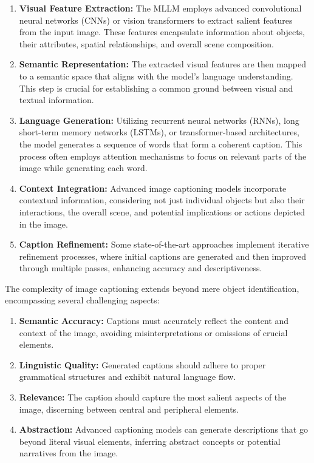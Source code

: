 \begin{enumerate}
    \item \textbf{Visual Feature Extraction:} The MLLM employs advanced convolutional neural networks (CNNs) or vision transformers to extract salient features from the input image. These features encapsulate information about objects, their attributes, spatial relationships, and overall scene composition.
    \item \textbf{Semantic Representation:} The extracted visual features are then mapped to a semantic space that aligns with the model's language understanding. This step is crucial for establishing a common ground between visual and textual information.
    \item \textbf{Language Generation:} Utilizing recurrent neural networks (RNNs), long short-term memory networks (LSTMs), or transformer-based architectures, the model generates a sequence of words that form a coherent caption. This process often employs attention mechanisms to focus on relevant parts of the image while generating each word.
    \item \textbf{Context Integration:} Advanced image captioning models incorporate contextual information, considering not just individual objects but also their interactions, the overall scene, and potential implications or actions depicted in the image.
    \item \textbf{Caption Refinement:} Some state-of-the-art approaches implement iterative refinement processes, where initial captions are generated and then improved through multiple passes, enhancing accuracy and descriptiveness.
\end{enumerate}


The complexity of image captioning extends beyond mere object identification, encompassing several challenging aspects:

\begin{enumerate}
    \item \textbf{Semantic Accuracy:} Captions must accurately reflect the content and context of the image, avoiding misinterpretations or omissions of crucial elements.
    \item \textbf{Linguistic Quality:} Generated captions should adhere to proper grammatical structures and exhibit natural language flow.
    \item \textbf{Relevance:} The caption should capture the most salient aspects of the image, discerning between central and peripheral elements.
    \item \textbf{Abstraction:} Advanced captioning models can generate descriptions that go beyond literal visual elements, inferring abstract concepts or potential narratives from the image.
\end{enumerate}


